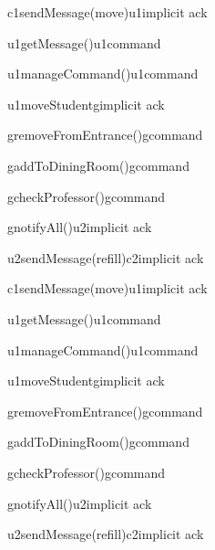 \documentclass[a4paper]{article}
\begin{document}
	\begin{center}
		\begin{sequencediagram}

			\begin{call}{c1}{sendMessage(move)}{u1}{implicit ack}
				\begin{call}{u1}{getMessage()}{u1}{command}
				\end{call}
				\begin{call}{u1}{manageCommand()}{u1}{command}
				\end{call}
				\begin{call}{u1}{moveStudent}{g}{implicit ack}
					\begin{call}{g}{removeFromEntrance()}{g}{command}
					\end{call}
					\begin{call}{g}{addToDiningRoom()}{g}{command}
					\end{call}
					\begin{call}{g}{checkProfessor()}{g}{command}
					\end{call}
					\begin{call}{g}{notifyAll()}{u2}{implicit ack}
						\begin{call}{u2}{sendMessage(refill)}{c2}{implicit ack}
						\end{call}
					\end{call}
				\end{call}
			\end{call}
			\begin{call}{c1}{sendMessage(move)}{u1}{implicit ack}
				\begin{call}{u1}{getMessage()}{u1}{command}
				\end{call}
				\begin{call}{u1}{manageCommand()}{u1}{command}
				\end{call}
				\begin{call}{u1}{moveStudent}{g}{implicit ack}
					\begin{call}{g}{removeFromEntrance()}{g}{command}
					\end{call}
					\begin{call}{g}{addToDiningRoom()}{g}{command}
					\end{call}
					\begin{call}{g}{checkProfessor()}{g}{command}
					\end{call}
					\begin{call}{g}{notifyAll()}{u2}{implicit ack}
						\begin{call}{u2}{sendMessage(refill)}{c2}{implicit ack}
						\end{call}
					\end{call}
				\end{call}
			\end{call}
		\end{sequencediagram}
	\end{center}
\end{document}
